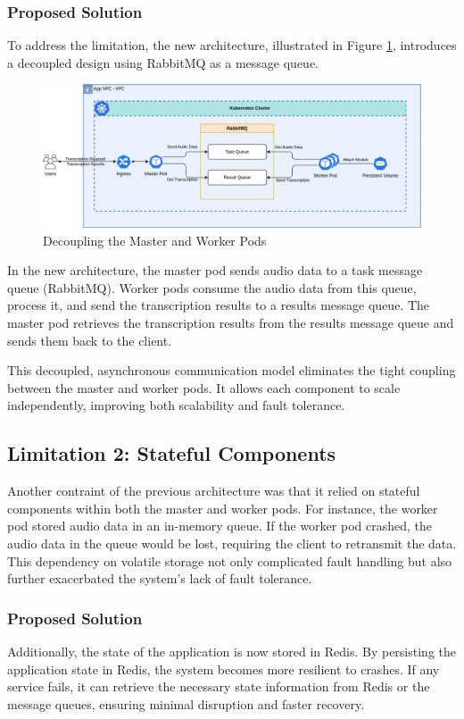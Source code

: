 \subsubsection{Proposed Solution}
To address the limitation, the new architecture, illustrated in Figure \ref{fig:decouple}, introduces a decoupled design using RabbitMQ as a message queue.

\begin{figure}[!ht]
    \centering
    \includegraphics[width=\textwidth]{figures/decouple.drawio.png}
    \caption{Decoupling the Master and Worker Pods}
    \label{fig:decouple}
\end{figure}

In the new architecture, the master pod sends audio data to a task message queue (RabbitMQ). Worker pods consume the audio data from this queue, process it, and send the transcription results to a results message queue. The master pod retrieves the transcription results from the results message queue and sends them back to the client.

This decoupled, asynchronous communication model eliminates the tight coupling between the master and worker pods. It allows each component to scale independently, improving both scalability and fault tolerance.

\subsection{Limitation 2: Stateful Components}
Another contraint of the previous architecture was that it relied on stateful components within both the master and worker pods. For instance, the worker pod stored audio data in an in-memory queue. If the worker pod crashed, the audio data in the queue would be lost, requiring the client to retransmit the data. This dependency on volatile storage not only complicated fault handling but also further exacerbated the system’s lack of fault tolerance.

\subsubsection{Proposed Solution}
Additionally, the state of the application is now stored in Redis. By persisting the application state in Redis, the system becomes more resilient to crashes. If any service fails, it can retrieve the necessary state information from Redis or the message queues, ensuring minimal disruption and faster recovery.

